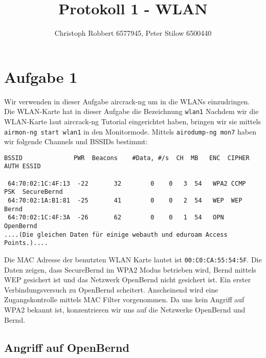 \documentclass[10pt,a4paper]{article}
\author{Christoph Robbert 6577945, Peter Stilow 6500440}
\title{Protokoll 1 - WLAN}
\begin{document}
\maketitle
 
\section{Aufgabe 1}

Wir verwenden in dieser Aufgabe aircrack-ng um in die WLANs einzudringen. Die WLAN-Karte hat in dieser Aufgabe die Bezeichnung \texttt{wlan1}
Nachdem wir die WLAN-Karte laut aircrack-ng Tutorial eingerichtet haben, bringen wir sie mittels
\texttt{airmon-ng start wlan1} in den Monitormode. Mittels \texttt{airodump-ng mon7} haben wir folgende Channels und BSSIDs bestimmt:
\begin{verbatim}
BSSID              PWR  Beacons    #Data, #/s  CH  MB   ENC  CIPHER AUTH ESSID                                                                                                 
                                                                                                                                                                                
 64:70:02:1C:4F:13  -22       32        0    0   3  54   WPA2 CCMP   PSK  SecureBernd                                                                                           
 64:70:02:1A:B1:81  -25       41        0    0   2  54   WEP  WEP         Bernd                                                                                                 
 64:70:02:1C:4F:3A  -26       62        0    0   1  54   OPN              OpenBernd                                                                                             
....(Die gleichen Daten für einige webauth und eduroam Access Points.)....
\end{verbatim}
Die MAC Adresse der benutzten WLAN Karte lautet ist \texttt{00:C0:CA:55:54:5F}.
Die Daten zeigen, dass SecureBernd im WPA2 Modus betrieben wird, Bernd mittels WEP gesichert ist und das Netzwerk OpenBernd nicht gesichert ist. Ein erster Verbindungsversuch zu OpenBernd scheitert. Anscheinend wird eine Zugangskontrolle mittels MAC Filter vorgenommen. Da uns kein Angriff auf WPA2 bekannt ist, konzentrieren wir uns auf die Netzwerke OpenBernd und Bernd.

\subsection{Angriff auf OpenBernd}
\end{document}
